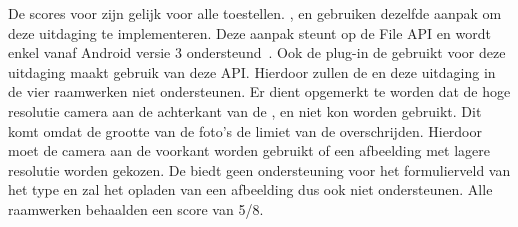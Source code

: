 De scores voor  zijn gelijk voor alle toestellen.
\kendo{}, \jqm{} en \lungo{} gebruiken dezelfde aanpak om deze uitdaging te implementeren.
Deze aanpak steunt op de File API en wordt enkel vanaf Android versie 3 ondersteund~\cite{Deveria2013c}.
Ook de plug-in de \st{} gebruikt voor deze uitdaging maakt gebruik van deze API.
Hierdoor zullen de \htc{} en \gtab{} deze uitdaging in de vier raamwerken niet ondersteunen.
Er dient opgemerkt te worden dat de hoge resolutie camera aan de achterkant van de \ipadiii{}, \iphoneiii{} en \iphoneiv{} niet kon worden gebruikt.
Dit komt omdat de grootte van de foto's de limiet van de  overschrijden.
Hierdoor moet de camera aan de voorkant worden gebruikt of een afbeelding met lagere resolutie worden gekozen.
De \ipadi{} biedt geen ondersteuning voor het formulierveld van het type  en zal het opladen van een afbeelding dus ook niet ondersteunen.
Alle raamwerken behaalden een score van 5/8.

% 
% 
% 
% 

